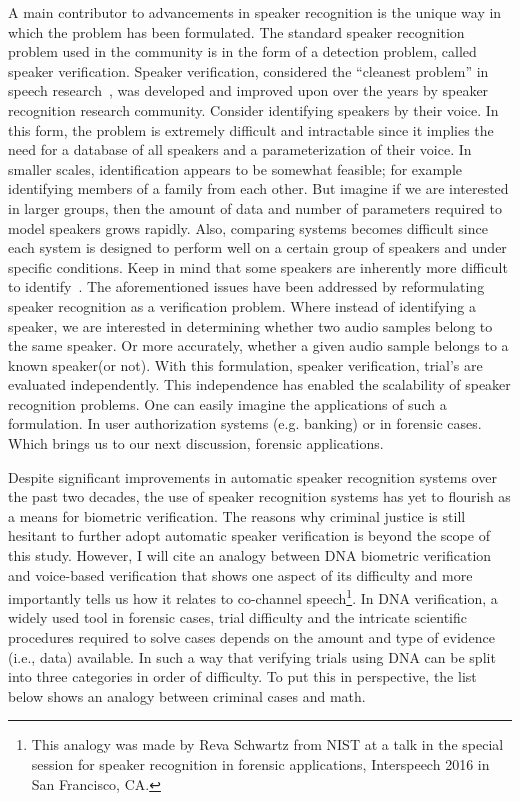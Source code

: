 A main contributor to advancements in speaker recognition is the unique way in which the problem has been formulated. 
The standard speaker recognition problem used in the community is in the form of a detection problem, called speaker verification. 
Speaker verification, considered the ``cleanest problem'' in speech research~\cite{anintroductiontoapplicationindependentevaluationofspeakerrecognitionsystems}, was developed and improved upon over the years by speaker recognition research community. 
Consider identifying speakers by their voice. 
In this form, the problem is extremely difficult and intractable since it implies the need for a database of all speakers and a parameterization of their voice. 
In smaller scales, identification appears to be somewhat feasible; for example identifying members of a family from each other. 
But imagine if we are interested in larger groups, then the amount of data and number of parameters required to model speakers grows rapidly. 
Also, comparing systems becomes difficult since each system is designed to perform well on a certain group of speakers and under specific conditions. 
Keep in mind that some speakers are inherently more difficult to identify~\cite{farmmodel}.
The aforementioned issues have been addressed by reformulating speaker recognition as a verification problem. 
Where instead of identifying a speaker, we are interested in determining whether two audio samples belong to the same speaker. 
Or more accurately, whether a given audio sample belongs to a known speaker(or not). 
With this formulation, speaker verification, trial's are evaluated independently. 
This independence has enabled the scalability of speaker recognition problems. 
One can easily imagine the applications of such a formulation. 
In user authorization systems (e.g. banking) or in forensic cases. 
Which brings us to our next discussion, forensic applications. 

Despite significant improvements in automatic speaker recognition systems over the past two decades, the use of speaker recognition systems has yet to flourish as a means for biometric verification. 
The reasons why criminal justice is still hesitant to further adopt automatic speaker verification is beyond the scope of this study. 
However, I will cite an analogy between DNA biometric verification and voice-based verification that shows one aspect of its difficulty and more importantly tells us how it relates to co-channel speech\footnote{This analogy was made by Reva Schwartz from NIST at a talk in the special session for speaker recognition in forensic applications, Interspeech 2016 in San Francisco, CA.}. 
In DNA verification, a widely used tool in forensic cases, trial difficulty and the intricate scientific procedures required to solve cases depends on the amount and type of evidence (i.e., data) available. 
In such a way that verifying trials using DNA can be split into three categories in order of difficulty. To put this in perspective, the list below shows an analogy between criminal cases and math. 

